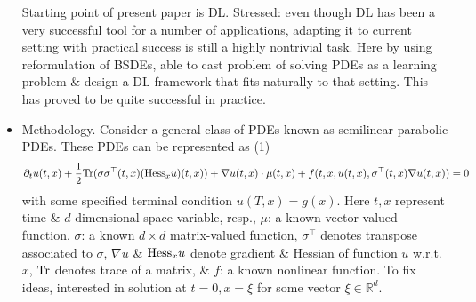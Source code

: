 \documentclass{article}
\begin{document}
\begin{itemize}
	Starting point of present paper is DL. Stressed: even though DL has been a very successful tool for a number of applications, adapting it to current setting with practical success is still a highly nontrivial task. Here by using reformulation of BSDEs, able to cast problem of solving PDEs as a learning problem \& design a DL framework that fits naturally to that setting. This has proved to be quite successful in practice.
	\item {\sf Methodology.} Consider a general class of PDEs known as semilinear parabolic PDEs. These PDEs can be represented as (1)
	\begin{equation*}
		\partial_tu(t,x) + \frac{1}{2}{\rm Tr}(\sigma\sigma^\top(t,x)({\rm Hess}_xu)(t,x)) + \nabla u(t,x)\cdot\mu(t,x) + f(t,x,u(t,x),\sigma^\top(t,x)\nabla u(t,x)) = 0
	\end{equation*}
	with some specified terminal condition $u(T,x) = g(x)$. Here $t,x$ represent time \& $d$-dimensional space variable, resp., $\mu$: a known vector-valued function, $\sigma$: a known $d\times d$ matrix-valued function, $\sigma^\top$ denotes transpose associated to $\sigma$, $\nabla u$ \& ${\rm Hess}_xu$ denote gradient \& Hessian of function $u$ w.r.t. $x$, ${\rm Tr}$ denotes trace of a matrix, \& $f$: a known nonlinear function. To fix ideas, interested in solution at $t = 0,x = \xi$ for some vector $\xi\in\mathbb{R}^d$.
	

\end{itemize}
\end{document}
